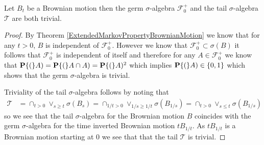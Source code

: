 \begin{lem}\label{Blumenthal01LawBrownianMotion}Let $B_t$ be a Brownian
  motion then the germ $\sigma$-algebra $\mathcal{F}^+_0$ and the tail
  $\sigma$-algebra $\mathcal{T}$ are both trivial.
\end{lem}
\begin{proof}
By Theorem \ref{ExtendedMarkovPropertyBrownianMotion} we know that for
any $t > 0$, $B$ is independent of $\mathcal{F}^+_0 $.
However we know that $\mathcal{F}^+_0 \subset
\sigma(B)$ it follows that $\mathcal{F}^+_0$ is independent of
itself and therefore for any $A \in \mathcal{F}^+_0$ we know that
$\textbf{P}\{(\}A) = \textbf{P}\{(\}A \cap A) = \textbf{P}\{(\}A)^2$ which
implies $\textbf{P}\{(\}A) \in \lbrace 0,1 \rbrace$ which shows that the
germ $\sigma$-algebra is trivial.

Triviality of the tail $\sigma$-algebra follows by noting that 
\begin{align*}
\mathcal{T} &= \cap_{t > 0} \vee_{s \geq    t} \sigma(B_s) 
= \cap_{1/t >  0} \vee_{1/s \geq 1/t} \sigma(B_{1/s})
= \cap_{t >  0} \vee_{s \leq t} \sigma(B_{1/s})
\end{align*}
so we see that the tail $\sigma$-algebra for the Brownian motion $B$
coincides with the germ $\sigma$-algebra for the time inverted
Brownian motion $t B_{1/t}$.  As $tB_{1/t}$ is a Brownian motion
starting at $0$ we see that that the tail $\mathcal{T}$ is trivial.
\end{proof}


